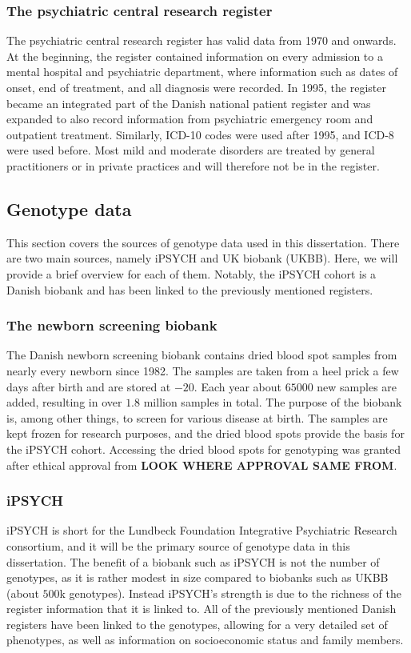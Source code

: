 \subsubsection{The psychiatric central research register}
The psychiatric central research register has valid data from 1970 and onwards. At the beginning, the register contained information on every admission to a mental hospital and psychiatric department, where information such as dates of onset, end of treatment, and all diagnosis were recorded. In 1995, the register became an integrated part of the Danish national patient register and was expanded to also record information from psychiatric emergency room and outpatient treatment. Similarly, ICD-10 codes were used after 1995, and ICD-8 were used before. Most mild and moderate disorders are treated by general practitioners or in private practices and will therefore not be in the register.\cite{mors2011danish}



\subsection{Genotype data}
This section covers the sources of genotype data used in this dissertation. There are two main sources, namely iPSYCH and UK biobank (UKBB). Here, we will provide a brief overview for each of them. Notably, the iPSYCH cohort is a Danish biobank and has been linked to the previously mentioned registers. 

\subsubsection{The newborn screening biobank}
The Danish newborn screening biobank contains dried blood spot samples from nearly every newborn since 1982. The samples are taken from a heel prick a few days after birth and are stored at $ -20 $\textcelsius. Each year about $ 65000 $ new samples are added, resulting in over $ 1.8 $ million samples in total. The purpose of the biobank is, among other things, to screen for various disease at birth. The samples are kept frozen for research purposes, and the dried blood spots provide the basis for the iPSYCH cohort. Accessing the dried blood spots for genotyping was granted after ethical approval from \textbf{LOOK WHERE APPROVAL SAME FROM}. \cite{norgaard2007storage}

\subsubsection{iPSYCH}
iPSYCH is short for the Lundbeck Foundation Integrative Psychiatric Research consortium, and it will be the primary source of genotype data in this dissertation. The benefit of a biobank such as iPSYCH is not the number of genotypes, as it is rather modest in size compared to biobanks such as UKBB (about $ 500 $k genotypes). Instead iPSYCH's strength is due to the richness of the register information that it is linked to. All of the previously mentioned Danish registers have been linked to the genotypes, allowing for a very detailed set of phenotypes, as well as information on socioeconomic status and family members.

